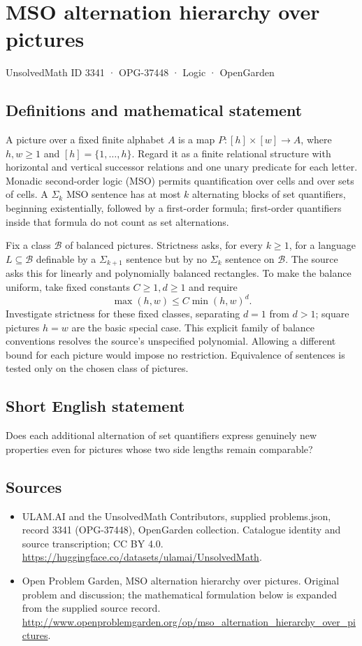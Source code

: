 \documentclass[11pt,a4paper]{article}
\begin{document}
\section*{MSO alternation hierarchy over pictures}\label{3341}
{\small UnsolvedMath ID 3341 · OPG-37448 · Logic · OpenGarden}
\subsection{Definitions and mathematical statement}
A picture over a fixed finite alphabet $A$ is a map
$P:[h]\times[w]\to A$, where $h,w\ge1$ and $[h]=\{1,\ldots,h\}$.
Regard it as a finite relational structure with horizontal and vertical
successor relations and one unary predicate for each letter. Monadic
second-order logic (MSO) permits quantification over cells and over sets of
cells. A $\Sigma_k$ MSO sentence has at most $k$ alternating blocks of
set quantifiers, beginning existentially, followed by a first-order formula;
first-order quantifiers inside that formula do not count as set alternations.

Fix a class $\mathcal B$ of balanced pictures. Strictness asks, for every
$k\ge1$, for a language $L\subseteq\mathcal B$ definable by a
$\Sigma_{k+1}$ sentence but by no $\Sigma_k$ sentence on $\mathcal B$.
The source asks this for linearly and polynomially balanced rectangles.
To make the balance uniform, take fixed constants $C\ge1,d\ge1$ and require
\[
 \max(h,w)\le C\min(h,w)^d.
\]
Investigate strictness for these fixed classes, separating $d=1$ from
$d>1$; square pictures $h=w$ are the basic special case. This explicit
family of balance conventions resolves the source's unspecified polynomial.
Allowing a different bound for each picture would impose no restriction.
Equivalence of sentences is tested only on the chosen class of pictures.
\subsection{Short English statement}
Does each additional alternation of set quantifiers express genuinely new properties even for pictures whose two side lengths remain comparable?
\subsection{Sources}
\begin{itemize}
\item[S1] ULAM.AI and the UnsolvedMath Contributors, supplied problems.json, record 3341 (OPG-37448), OpenGarden collection. Catalogue identity and source transcription; CC BY 4.0.
\url{https://huggingface.co/datasets/ulamai/UnsolvedMath}.
\item[S2] Open Problem Garden, MSO alternation hierarchy over pictures. Original problem and discussion; the mathematical formulation below is expanded from the supplied source record.
\url{http://www.openproblemgarden.org/op/mso_alternation_hierarchy_over_pictures}.
\end{itemize}
\end{document}

